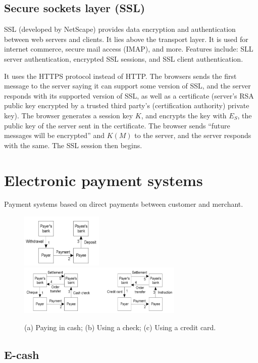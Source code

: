 \documentclass[twoside]{article}
\begin{document}
\subsection{Secure sockets layer (SSL)}

SSL (developed by NetScape) provides data encryption and authentication between web servers and clients. It lies above the transport layer. It is used for internet commerce, secure mail access (IMAP), and more. Features include: SLL server authentication, encrypted SSL sessions, and SSL client authentication.

It uses the HTTPS protocol instead of HTTP. The browsers sends the first message to the server saying it can support some version of SSL, and the server responds with its supported version of SSL, as well as a certificate (server's RSA public key encrypted by a trusted third party's (certification authority) private key). The browser generates a session key $K$, and encrypts the key with $E_S$, the public key of the server sent in the certificate. The browser sends ``future messages will be encrypted'' and $K(M)$ to the server, and the server responds with the same. The SSL session then begins.

\section{Electronic payment systems}

Payment systems based on direct payments between customer and merchant. 

\begin{figure}[H]
\centering
\includegraphics[width=0.35\textwidth]{eps1.png}
\centering
\includegraphics[width=0.7\textwidth]{eps2.png}
\caption{(a) Paying in cash; (b) Using a check; (c) Using a credit card.}
\end{figure}

\subsection{E-cash}
\end{document}
